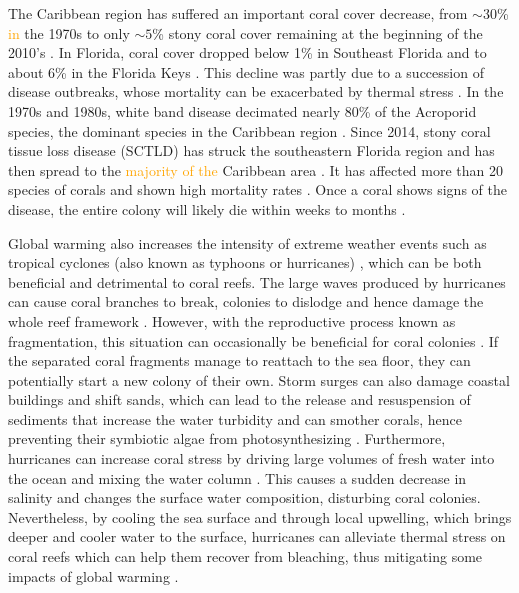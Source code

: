 \documentclass[fleqn,10pt]{wlscirep}
\newcommand{\modif}[1]{\textcolor{orange}{#1}}
\begin{document}
The Caribbean region has suffered an important coral cover decrease, from $\sim30$\% \modif{in} the 1970s to only $\sim5$\% stony coral cover remaining at the beginning of the 2010's  \citep{Porter1992Dec,Ruzicka2013Aug}. In Florida, coral cover dropped below 1\% in Southeast Florida and to about 6\% in the Florida Keys \cite{grove2022national}. This decline was partly due to a succession of disease outbreaks, whose mortality can be exacerbated by thermal stress \citep{muller2012caribbean,muller2018bleaching}. In the 1970s and 1980s, white band disease decimated nearly 80\% of the Acroporid species, the dominant species in the Caribbean region \citep{Kline2011,Aronson2001Sep}. Since 2014, stony coral tissue loss disease (SCTLD) has struck the southeastern Florida region and has then spread to the \modif{majority of the} Caribbean area \citep{Precht2016Aug}. It has affected more than 20 species of corals and shown high mortality rates \citep{Alvarez-Filip2022Jun}. Once a coral shows signs of the disease, the entire  colony will likely die within weeks to months \citep{NOAA2020Nov}.

Global warming also increases the intensity of extreme weather events such as tropical cyclones (also known as typhoons or hurricanes) \modif{\citep{Bhatia2019Feb, Knutson2020Mar}}, which can be both beneficial and detrimental to coral reefs. The large waves produced by hurricanes can cause coral branches to break, colonies to dislodge and hence damage the whole reef framework \citep{Scoffin1993Nov, Carter2022}. However, with the reproductive process known as fragmentation, this situation can occasionally be beneficial for coral colonies \citep{Bonin2011Jul}. If the separated coral fragments manage to reattach to the sea floor, they can potentially start a new colony of their own. Storm surges can also damage coastal buildings and shift sands, which can lead to the release and resuspension of sediments that increase the water turbidity and can smother corals, hence preventing their symbiotic algae from photosynthesizing \citep{Erftemeijer2012Sep, Jones2015Nov}. Furthermore, hurricanes can increase coral stress by driving large volumes of fresh water into the ocean and mixing the water column \citep{Allahdadi2017Apr}. This causes a sudden decrease in salinity and changes the surface water composition, disturbing coral colonies. Nevertheless, by cooling the sea surface and through local upwelling, which brings deeper and cooler water to the surface, hurricanes can alleviate thermal stress on coral reefs which can help them recover from bleaching, thus mitigating some impacts of global warming \citep{Aijaz2017May, Varlas2020Jul, Manzello2007Jul}.
\end{document}
